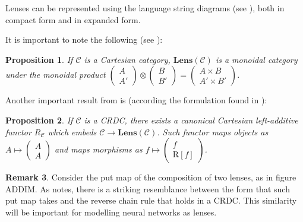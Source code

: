 \documentclass[11pt,a4paper,openright,twoside]{report}
\theoremstyle{plain}
\newtheorem{proposition}{Proposition}
\theoremstyle{definition}
\newtheorem{remark}[proposition]{Remark}
\begin{document}
Lenses can be represented using the language string diagrams (see \cite{cruttwellDeepLearningParametric}), both in compact form and in expanded form.


It is important to note the following (see \cite{cruttwellDeepLearningParametric}):

\begin{proposition}
  If $\mathcal{C}$ is a Cartesian category, $\mathbf{Lens}(\mathcal{C})$ is a monoidal category under the monoidal product $\left(\begin{smallmatrix} A \\ A' \end{smallmatrix}\right) \otimes \left(\begin{smallmatrix} B \\ B' \end{smallmatrix}\right) = \left(\begin{smallmatrix} A \times B \\ A' \times B' \end{smallmatrix}\right)$.
\end{proposition}

Another important result from \cite{cruttwellDeepLearningParametric} is (according the formulation found in \cite{shieblerCategoryTheoryMachine2021}):

\begin{proposition}\label{proposition: canembedding1}
  If $\mathcal{C}$ is a CRDC, there exists a canonical Cartesian left-additive functor $R_\mathcal{C}$ which embeds $\mathcal{C} \to \mathbf{Lens}(\mathcal{C})$. Such functor maps objects as $A \mapsto \left(\begin{smallmatrix}A \\ A\end{smallmatrix}\right)$ and maps morphisms as $f \mapsto \left(\begin{smallmatrix}f \\ \mathrm{R}[f]\end{smallmatrix}\right)$.
\end{proposition}

\begin{remark}
  Consider the put map of the composition of two lenses, as in figure ADDIM. As \cite{shieblerCategoryTheoryMachine2021} notes, there is a striking resemblance between the form that such put map takes and the reverse chain rule that holds in a CRDC. This similarity will be important for modelling neural networks as lenses. 
\end{remark}
\end{document}
